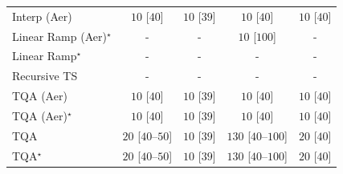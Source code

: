 \begin{tabular}{l|cccc|}
Interp (Aer) & {\cellcolor[HTML]{F7FCF5}} \color[HTML]{000000} $10$ [$40$] & {\cellcolor[HTML]{F7FCF5}} \color[HTML]{000000} $10$ [$39$] & {\cellcolor[HTML]{F7FCF5}} \color[HTML]{000000} $10$ [$40$] & {\cellcolor[HTML]{F7FCF5}} \color[HTML]{000000} $10$ [$40$] \\
Linear Ramp (Aer)$^\star$ & {\cellcolor[HTML]{000000}} \color[HTML]{F1F1F1} {\cellcolor{white}} \color{black} - & {\cellcolor[HTML]{000000}} \color[HTML]{F1F1F1} {\cellcolor{white}} \color{black} - & {\cellcolor[HTML]{F7FCF5}} \color[HTML]{000000} $10$ [$100$] & {\cellcolor[HTML]{000000}} \color[HTML]{F1F1F1} {\cellcolor{white}} \color{black} - \\
Linear Ramp$^\star$ & {\cellcolor[HTML]{000000}} \color[HTML]{F1F1F1} {\cellcolor{white}} \color{black} - & {\cellcolor[HTML]{000000}} \color[HTML]{F1F1F1} {\cellcolor{white}} \color{black} - & {\cellcolor[HTML]{000000}} \color[HTML]{F1F1F1} {\cellcolor{white}} \color{black} - & {\cellcolor[HTML]{000000}} \color[HTML]{F1F1F1} {\cellcolor{white}} \color{black} - \\
Recursive TS & {\cellcolor[HTML]{000000}} \color[HTML]{F1F1F1} {\cellcolor{white}} \color{black} - & {\cellcolor[HTML]{000000}} \color[HTML]{F1F1F1} {\cellcolor{white}} \color{black} - & {\cellcolor[HTML]{000000}} \color[HTML]{F1F1F1} {\cellcolor{white}} \color{black} - & {\cellcolor[HTML]{000000}} \color[HTML]{F1F1F1} {\cellcolor{white}} \color{black} - \\
TQA (Aer) & {\cellcolor[HTML]{F7FCF5}} \color[HTML]{000000} $10$ [$40$] & {\cellcolor[HTML]{F7FCF5}} \color[HTML]{000000} $10$ [$39$] & {\cellcolor[HTML]{F7FCF5}} \color[HTML]{000000} $10$ [$40$] & {\cellcolor[HTML]{F7FCF5}} \color[HTML]{000000} $10$ [$40$] \\
TQA (Aer)$^\star$ & {\cellcolor[HTML]{F7FCF5}} \color[HTML]{000000} $10$ [$40$] & {\cellcolor[HTML]{F7FCF5}} \color[HTML]{000000} $10$ [$39$] & {\cellcolor[HTML]{F7FCF5}} \color[HTML]{000000} $10$ [$40$] & {\cellcolor[HTML]{F7FCF5}} \color[HTML]{000000} $10$ [$40$] \\
TQA & {\cellcolor[HTML]{F5FBF3}} \color[HTML]{000000} $20$ [$40$--$50$] & {\cellcolor[HTML]{F7FCF5}} \color[HTML]{000000} $10$ [$39$] & {\cellcolor[HTML]{DAF0D4}} \color[HTML]{000000} $130$ [$40$--$100$] & {\cellcolor[HTML]{F5FBF3}} \color[HTML]{000000} $20$ [$40$] \\
TQA$^\star$ & {\cellcolor[HTML]{F5FBF3}} \color[HTML]{000000} $20$ [$40$--$50$] & {\cellcolor[HTML]{F7FCF5}} \color[HTML]{000000} $10$ [$39$] & {\cellcolor[HTML]{DAF0D4}} \color[HTML]{000000} $130$ [$40$--$100$] & {\cellcolor[HTML]{F5FBF3}} \color[HTML]{000000} $20$ [$40$] \\

\end{tabular}
